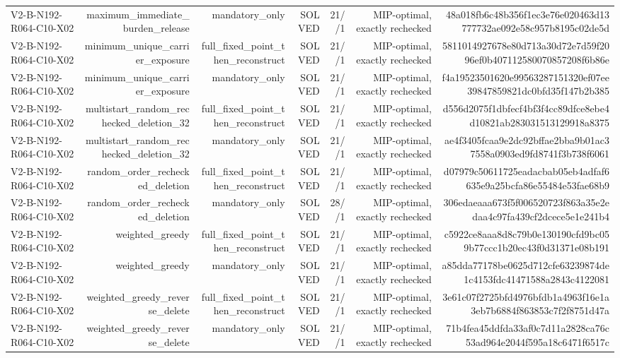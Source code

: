 {\begin{longtable}{lrrrrrr}
V2-B-N192-R064-C10-X02 & maximum\_immediate\_burden\_release & mandatory\_only & SOLVED & 21//1 & MIP-optimal, exactly rechecked & 48a018fb6c48b356f1ec3e76e020463d13777732ae092e58c957b8195c02de5d \\
V2-B-N192-R064-C10-X02 & minimum\_unique\_carrier\_exposure & full\_fixed\_point\_then\_reconstruct & SOLVED & 21//1 & MIP-optimal, exactly rechecked & 5811014927678e80d713a30d72e7d59f2096ef0b407112580070857208f6b86e \\
V2-B-N192-R064-C10-X02 & minimum\_unique\_carrier\_exposure & mandatory\_only & SOLVED & 21//1 & MIP-optimal, exactly rechecked & f4a19523501620e99563287151320ef07ee39847859821dc0bfd35f147b2b385 \\
V2-B-N192-R064-C10-X02 & multistart\_random\_rechecked\_deletion\_32 & full\_fixed\_point\_then\_reconstruct & SOLVED & 21//1 & MIP-optimal, exactly rechecked & d556d2075f1dbfecf4bf3f4cc89dfce8ebe4d10821ab283031513129918a8375 \\
V2-B-N192-R064-C10-X02 & multistart\_random\_rechecked\_deletion\_32 & mandatory\_only & SOLVED & 21//1 & MIP-optimal, exactly rechecked & ae4f3405fcaa9e2dc92bffae2bba9b01ac37558a0903ed9fd8741f3b738f6061 \\
V2-B-N192-R064-C10-X02 & random\_order\_rechecked\_deletion & full\_fixed\_point\_then\_reconstruct & SOLVED & 21//1 & MIP-optimal, exactly rechecked & d07979c50611725eadacbab05eb4adfaf6635e9a25bcfa86e55484e53fae68b9 \\
V2-B-N192-R064-C10-X02 & random\_order\_rechecked\_deletion & mandatory\_only & SOLVED & 28//1 & MIP-optimal, exactly rechecked & 306edaeaaa673f5f006520723f863a35e2edaa4c97fa439cf2dcece5e1e241b4 \\
V2-B-N192-R064-C10-X02 & weighted\_greedy & full\_fixed\_point\_then\_reconstruct & SOLVED & 21//1 & MIP-optimal, exactly rechecked & c5922ce8aaa8d8c79b0e130190cfd9bc059b77ccc1b20ec43f0d31371e08b191 \\
V2-B-N192-R064-C10-X02 & weighted\_greedy & mandatory\_only & SOLVED & 21//1 & MIP-optimal, exactly rechecked & a85dda77178be0625d712cfe63239874de1c4153fdc41471588a2843c4122081 \\
V2-B-N192-R064-C10-X02 & weighted\_greedy\_reverse\_delete & full\_fixed\_point\_then\_reconstruct & SOLVED & 21//1 & MIP-optimal, exactly rechecked & 3e61c07f2725bfd4976bfdb1a4963f16e1a3eb7b6884f863853c7f2f8751d47a \\
V2-B-N192-R064-C10-X02 & weighted\_greedy\_reverse\_delete & mandatory\_only & SOLVED & 21//1 & MIP-optimal, exactly rechecked & 71b4fea45ddfda33af0c7d11a2828ca76c53ad964e2044f595a18c6471f6517c \\

\end{longtable}}
